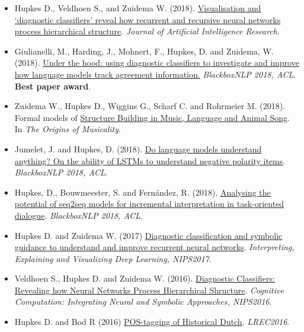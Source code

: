 \begin{itemize}
    \item Hupkes D., Veldhoen S., and Zuidema W. (2018). \href{https://jair.org/index.php/jair/article/view/11196/26408}{Visualisation and ‘diagnostic classifiers’ reveal how recurrent and recursive neural networks process hierarchical structure}. \textit{Journal of Artificial Intelligence Research}.
    
    \item Giulianelli, M., Harding, J., Mohnert, F., Hupkes, D. and Zuidema, W. (2018). \href{https://aclweb.org/anthology/W18-5426}{Under the hood: using diagnostic classifiers to investigate and improve how language models track agreement information.} \textit{BlackboxNLP 2018, ACL}. \\ \textbf{Best paper award}.
    
    \item Zuidema W., Hupkes D., Wiggins G., Scharf C. and Rohrmeier M. (2018). Formal models of \href{https://arxiv.org/abs/1901.05180}{Structure Building in Music, Language and Animal Song}. In \textit{The Origins of Musicality}.
    
    \item Jumelet, J. and Hupkes, D. (2018). \href{https://aclweb.org/anthology/W18-5424}{Do language models understand anything? On the ability of LSTMs to understand negative polarity items}. \textit{BlackboxNLP 2018, ACL}.
    
    \item Hupkes, D., Bouwmeester, S. and Fernández, R. (2018). \href{https://aclweb.org/anthology/W18-5419}{Analysing the potential of seq2seq models for incremental interpretation in task-oriented dialogue}. \textit{BlackboxNLP 2018, ACL}.
    
    \item Hupkes D. and Zuidema W. (2017) \href{http://www.interpretable-ml.org/nips2017workshop/papers/12.pdf}{Diagnostic classification and symbolic guidance to understand and improve recurrent neural networks}. \textit{Interpreting, Explaining and Visualizing Deep Learning, NIPS2017}.
    
    \item Veldhoen S., Hupkes D. and Zuidema W. (2016). \href{http://dieuwkehupkes.nl/research/nips2016.pdf}{Diagnostic Classifiers: Revealing how Neural
Networks Process Hierarchical Shructure}. \textit{Cognitive Computation: Integrating Neural and
Symbolic Approaches, NIPS2016}.

    \item Hupkes D. and Bod R (2016) \href{https://www.aclweb.org/anthology/L16-1012}{POS-tagging of Historical Dutch}. \textit{LREC2016}.
\end{itemize}
